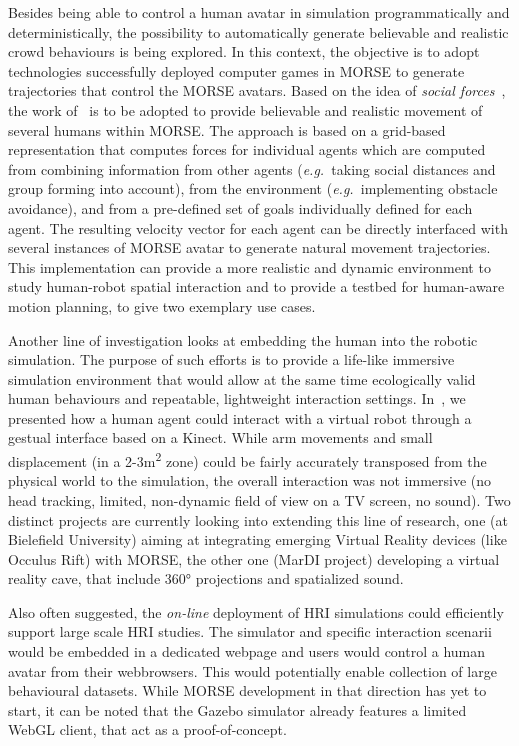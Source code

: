 \documentclass[conference]{IEEEtran}
\newcommand{\eg}{{\textit{e.g.~}}}
\begin{document}
Besides being able to control a human avatar in simulation programmatically and
deterministically, the possibility to automatically generate believable and
realistic crowd behaviours is being explored. In this context, the objective is
to adopt technologies successfully deployed computer games in MORSE to generate
trajectories that control the MORSE avatars.  Based on the idea of \emph{social
forces}~\cite{helbing2001}, the work of~\cite{Szymanezyk2012crowd} is to be
adopted to provide believable and realistic movement of several humans within
MORSE. The approach is based on a grid-based representation that computes forces
for individual agents which are computed from combining information from other
agents (\eg taking social distances and group forming into account), from the
environment (\eg implementing obstacle avoidance), and from a pre-defined set of
goals individually defined for each agent. The resulting velocity vector for
each agent can be directly interfaced with several instances of MORSE avatar to
generate natural movement trajectories. This implementation can provide a more
realistic and dynamic environment to study human-robot spatial interaction and
to provide a testbed for human-aware motion planning, to give two exemplary use
cases.

Another line of investigation looks at embedding the human into the robotic
simulation. The purpose of such efforts is to provide a life-like immersive
simulation environment that would allow at the same time ecologically valid
human behaviours and repeatable, lightweight interaction settings.
In~\cite{lemaignan2012morse}, we presented how a human agent could interact with
a virtual robot through a gestual interface based on a Kinect. While arm
movements and small displacement (in a 2-3m\textsuperscript{2} zone) could be fairly
accurately transposed from the physical world to the simulation, the overall
interaction was not immersive (no head tracking, limited, non-dynamic field of
view on a TV screen, no sound). Two distinct projects are currently looking into
extending this line of research, one (at Bielefield University) aiming at
integrating emerging Virtual Reality devices (like Occulus Rift) with MORSE, the
other one (MarDI project) developing a virtual reality cave, that include 360°
projections and spatialized sound.

Also often suggested, the \emph{on-line} deployment of HRI simulations could
efficiently support large scale HRI studies. The simulator and specific
interaction scenarii would be embedded in a dedicated webpage and users would
control a human avatar from their webbrowsers. This would potentially enable
collection of large behavioural datasets. While MORSE development in that
direction has yet to start, it can be noted that the Gazebo simulator already
features a limited WebGL client, that act as a proof-of-concept.
\end{document}
